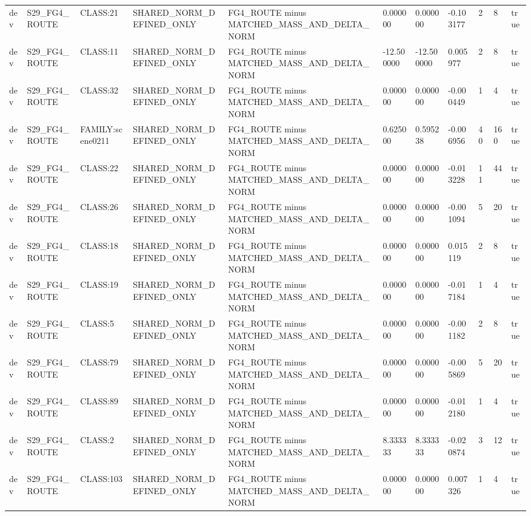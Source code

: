 \begin{tabular}{lllllllllll}
dev & S29\_FG4\_ROUTE & CLASS:21 & SHARED\_NORM\_DEFINED\_ONLY & FG4\_ROUTE minus MATCHED\_MASS\_AND\_DELTA\_NORM & 0.000000 & 0.000000 & -0.103177 & 2 & 8 & true \\
dev & S29\_FG4\_ROUTE & CLASS:11 & SHARED\_NORM\_DEFINED\_ONLY & FG4\_ROUTE minus MATCHED\_MASS\_AND\_DELTA\_NORM & -12.500000 & -12.500000 & 0.005977 & 2 & 8 & true \\
dev & S29\_FG4\_ROUTE & CLASS:32 & SHARED\_NORM\_DEFINED\_ONLY & FG4\_ROUTE minus MATCHED\_MASS\_AND\_DELTA\_NORM & 0.000000 & 0.000000 & -0.000449 & 1 & 4 & true \\
dev & S29\_FG4\_ROUTE & FAMILY:scene0211 & SHARED\_NORM\_DEFINED\_ONLY & FG4\_ROUTE minus MATCHED\_MASS\_AND\_DELTA\_NORM & 0.625000 & 0.595238 & -0.006956 & 40 & 160 & true \\
dev & S29\_FG4\_ROUTE & CLASS:22 & SHARED\_NORM\_DEFINED\_ONLY & FG4\_ROUTE minus MATCHED\_MASS\_AND\_DELTA\_NORM & 0.000000 & 0.000000 & -0.013228 & 11 & 44 & true \\
dev & S29\_FG4\_ROUTE & CLASS:26 & SHARED\_NORM\_DEFINED\_ONLY & FG4\_ROUTE minus MATCHED\_MASS\_AND\_DELTA\_NORM & 0.000000 & 0.000000 & -0.001094 & 5 & 20 & true \\
dev & S29\_FG4\_ROUTE & CLASS:18 & SHARED\_NORM\_DEFINED\_ONLY & FG4\_ROUTE minus MATCHED\_MASS\_AND\_DELTA\_NORM & 0.000000 & 0.000000 & 0.015119 & 2 & 8 & true \\
dev & S29\_FG4\_ROUTE & CLASS:19 & SHARED\_NORM\_DEFINED\_ONLY & FG4\_ROUTE minus MATCHED\_MASS\_AND\_DELTA\_NORM & 0.000000 & 0.000000 & -0.017184 & 1 & 4 & true \\
dev & S29\_FG4\_ROUTE & CLASS:5 & SHARED\_NORM\_DEFINED\_ONLY & FG4\_ROUTE minus MATCHED\_MASS\_AND\_DELTA\_NORM & 0.000000 & 0.000000 & -0.001182 & 2 & 8 & true \\
dev & S29\_FG4\_ROUTE & CLASS:79 & SHARED\_NORM\_DEFINED\_ONLY & FG4\_ROUTE minus MATCHED\_MASS\_AND\_DELTA\_NORM & 0.000000 & 0.000000 & -0.005869 & 5 & 20 & true \\
dev & S29\_FG4\_ROUTE & CLASS:89 & SHARED\_NORM\_DEFINED\_ONLY & FG4\_ROUTE minus MATCHED\_MASS\_AND\_DELTA\_NORM & 0.000000 & 0.000000 & -0.012180 & 1 & 4 & true \\
dev & S29\_FG4\_ROUTE & CLASS:2 & SHARED\_NORM\_DEFINED\_ONLY & FG4\_ROUTE minus MATCHED\_MASS\_AND\_DELTA\_NORM & 8.333333 & 8.333333 & -0.020874 & 3 & 12 & true \\
dev & S29\_FG4\_ROUTE & CLASS:103 & SHARED\_NORM\_DEFINED\_ONLY & FG4\_ROUTE minus MATCHED\_MASS\_AND\_DELTA\_NORM & 0.000000 & 0.000000 & 0.007326 & 1 & 4 & true \\

\end{tabular}
